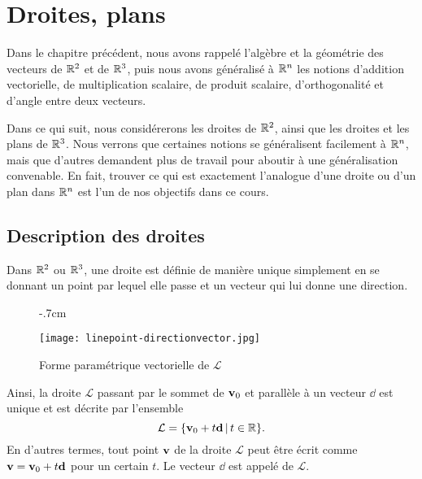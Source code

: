 \chapter{Droites, plans}
\label{chapter:Fr_03-linesplanes}

Dans le chapitre précédent, nous avons rappelé l'algèbre et la géométrie des vecteurs de
$\mathbb{R}^2$ et de $\mathbb{R}^3$, puis nous avons généralisé à $\mathbb{R}^n$ les notions d'addition vectorielle,
de multiplication scalaire, de produit scalaire, d'orthogonalité et d'angle entre deux vecteurs.  


Dans ce qui suit, nous considérerons les droites de $\mathbb{R}^2$, ainsi que les droites et les plans de $\mathbb{R}^3$.  
Nous verrons que certaines notions se généralisent facilement
à $\mathbb{R}^n$, mais que d'autres demandent plus de travail pour aboutir à une généralisation convenable. En fait, trouver ce qui est exactement
l'analogue d'une droite ou d'un plan dans $\mathbb{R}^n$ est l'un de nos objectifs dans ce cours.


\section{Description des droites}

Dans $\mathbb{R}^2$ ou $\mathbb{R}^3$, une droite est définie de manière unique simplement en se donnant un point par lequel elle passe et
un vecteur qui lui donne une direction. 
\begin{figure}
\begin{center}
\vglue-.7cm

\texttt{[image: linepoint-directionvector.jpg]}
\end{center}

\caption{Forme paramétrique vectorielle de $\mathcal L$}\label{vectorparametricformplane}
\end{figure}
Ainsi, la droite $\mathcal L$ passant par le sommet de $\mathbf{v}_0$ et parallèle à un vecteur $\dd$
est unique et est décrite par l'ensemble
$$
\mathcal L = \{ \mathbf{v}_0 + t \mathbf{d}\, |\, t\in \mathbb{R}\}.
$$
En d'autres termes, tout point $\mathbf{v}$ de la droite $\mathcal L$ peut être écrit comme $\mathbf{v} = \mathbf{v}_0+t\mathbf{d}$ pour un certain $t$. Le vecteur $\dd$ est appelé  de $\mathcal L$.

